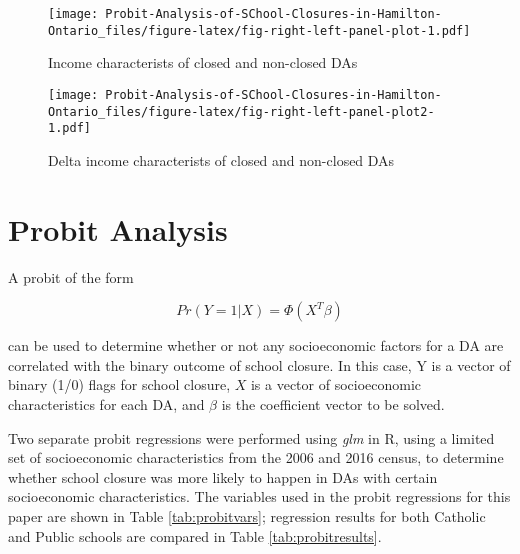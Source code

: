 \documentclass[]{elsarticle} %
\makeatletter
\def\maxwidth{\ifdim\Gin@nat@width>\linewidth\linewidth
\else\Gin@nat@width\fi}
\let\Oldincludegraphics\includegraphics
\renewcommand{\includegraphics}[1]{\Oldincludegraphics[width=\maxwidth]{#1}}
\makeatother
\begin{document}
\begin{figure}
\centering
\texttt{[image: Probit-Analysis-of-SChool-Closures-in-Hamilton-Ontario\_files/figure-latex/fig-right-left-panel-plot-1.pdf]}
\caption{\label{fig:densityplots} Income characterists of closed and
non-closed DAs}
\end{figure}

\begin{figure}
\centering
\texttt{[image: Probit-Analysis-of-SChool-Closures-in-Hamilton-Ontario\_files/figure-latex/fig-right-left-panel-plot2-1.pdf]}
\caption{\label{fig:deltaincomeplots} Delta income characterists of
closed and non-closed DAs}
\end{figure}

\hypertarget{probit-analysis}{%
\section{Probit Analysis}\label{probit-analysis}}

A probit of the form

\[
Pr(Y=1 | X) = \Phi(X^T\beta)
\]

can be used to determine whether or not any socioeconomic factors for a
DA are correlated with the binary outcome of school closure. In this
case, Y is a vector of binary (1/0) flags for school closure, \(X\) is a
vector of socioeconomic characteristics for each DA, and \(\beta\) is
the coefficient vector to be solved.

Two separate probit regressions were performed using \emph{glm} in R,
using a limited set of socioeconomic characteristics from the 2006 and
2016 census, to determine whether school closure was more likely to
happen in DAs with certain socioeconomic characteristics. The variables
used in the probit regressions for this paper are shown in Table
\ref{tab:probitvars}; regression results for both Catholic and Public
schools are compared in Table \ref{tab:probitresults}.

\begin{table}

\caption{\label{tab:table1-create}\label{tab:probitvars} Regression variables used}
\centering
{}
\end{table}
\end{document}
